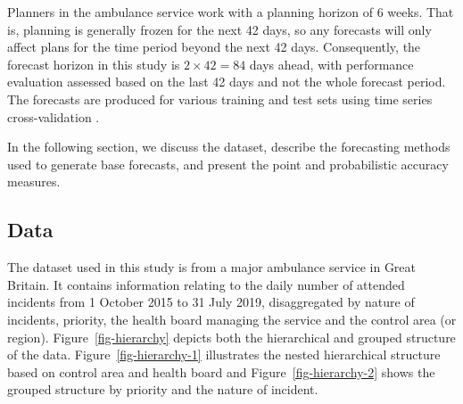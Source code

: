 \documentclass[
  authoryear,
  preprint,
  3p]{elsarticle}
\begin{document}
Planners in the ambulance service work with a planning horizon of 6
weeks. That is, planning is generally frozen for the next 42 days, so
any forecasts will only affect plans for the time period beyond the next
42 days. Consequently, the forecast horizon in this study is
\(2 \times 42 = 84\) days ahead, with performance evaluation assessed
based on the last 42 days and not the whole forecast period. The
forecasts are produced for various training and test sets using time
series cross-validation \citep{hyndman2021forecasting}.

In the following section, we discuss the dataset, describe the
forecasting methods used to generate base forecasts, and present the
point and probabilistic accuracy measures.

\hypertarget{sec-data}{%
\subsection{Data}\label{sec-data}}

The dataset used in this study is from a major ambulance service in
Great Britain. It contains information relating to the daily number of
attended incidents from 1 October 2015 to 31 July 2019, disaggregated by
nature of incidents, priority, the health board managing the service and
the control area (or region). Figure~\ref{fig-hierarchy} depicts both
the hierarchical and grouped structure of the data.
Figure~\ref{fig-hierarchy-1} illustrates the nested hierarchical
structure based on control area and health board and
Figure~\ref{fig-hierarchy-2} shows the grouped structure by priority and
the nature of incident.
\end{document}
